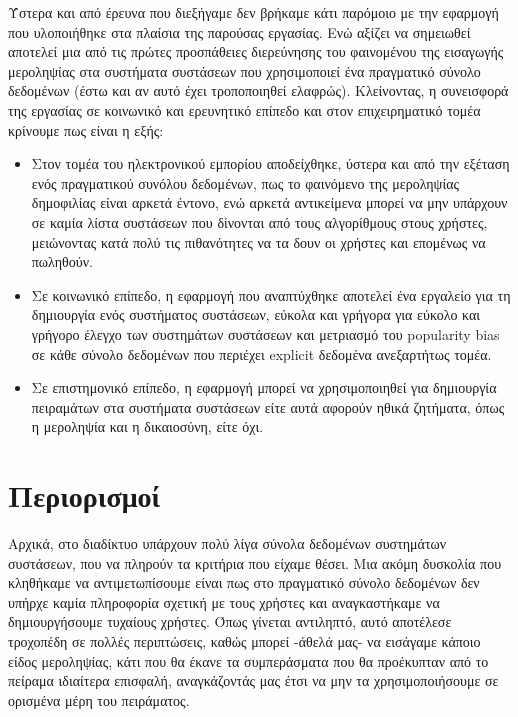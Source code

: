 \noindent Ύστερα και από έρευνα που διεξήγαμε δεν βρήκαμε κάτι παρόμοιο με την εφαρμογή που υλοποιήθηκε στα πλαίσια της παρούσας εργασίας. Ενώ αξίζει να σημειωθεί αποτελεί μια από τις πρώτες προσπάθειες διερεύνησης του φαινομένου της εισαγωγής μεροληψίας στα συστήματα συστάσεων που χρησιμοποιεί ένα πραγματικό σύνολο δεδομένων (έστω και αν αυτό έχει τροποποιηθεί ελαφρώς).
Κλείνοντας, η συνεισφορά της εργασίας σε κοινωνικό και ερευνητικό επίπεδο και στον επιχειρηματικό τομέα κρίνουμε πως είναι η εξής:\begin{itemize}
	\item Στον τομέα του ηλεκτρονικού εμπορίου αποδείχθηκε,  ύστερα και από την εξέταση ενός πραγματικού συνόλου δεδομένων,  πως το φαινόμενο της μεροληψίας δημοφιλίας είναι αρκετά έντονο, ενώ αρκετά αντικείμενα μπορεί να μην υπάρχουν σε καμία λίστα συστάσεων που δίνονται από τους αλγορίθμους στους χρήστες, μειώνοντας κατά πολύ τις πιθανότητες να τα δουν οι χρήστες και επομένως να πωληθούν. 
	\item Σε κοινωνικό επίπεδο, η εφαρμογή που αναπτύχθηκε αποτελεί ένα εργαλείο για τη δημιουργία ενός συστήματος συστάσεων, εύκολα και γρήγορα για εύκολο και γρήγορο έλεγχο των συστημάτων συστάσεων και μετριασμό του popularity bias σε κάθε σύνολο δεδομένων που περιέχει explicit δεδομένα ανεξαρτήτως τομέα. 
	\item Σε επιστημονικό επίπεδο, η εφαρμογή μπορεί να χρησιμοποιηθεί για δημιουργία πειραμάτων στα συστήματα συστάσεων είτε αυτά αφορούν ηθικά ζητήματα, όπως η μεροληψία και η δικαιοσύνη, είτε όχι.
\end{itemize}
\section{Περιορισμοί} \label{limitations}
\noindent Αρχικά, στο διαδίκτυο υπάρχουν πολύ λίγα σύνολα δεδομένων συστημάτων συστάσεων, που να πληρούν τα κριτήρια που είχαμε θέσει. Μια ακόμη δυσκολία που κληθήκαμε να αντιμετωπίσουμε είναι πως στο πραγματικό σύνολο δεδομένων δεν υπήρχε καμία πληροφορία σχετική με τους χρήστες και αναγκαστήκαμε να δημιουργήσουμε τυχαίους χρήστες. Όπως γίνεται αντιληπτό, αυτό αποτέλεσε τροχοπέδη σε πολλές περιπτώσεις, καθώς μπορεί -άθελά μας- να εισάγαμε κάποιο είδος μεροληψίας, κάτι που θα έκανε τα συμπεράσματα που θα προέκυπταν από το πείραμα ιδιαίτερα επισφαλή, αναγκάζοντάς μας έτσι να μην τα χρησιμοποιήσουμε σε ορισμένα μέρη του πειράματος.
